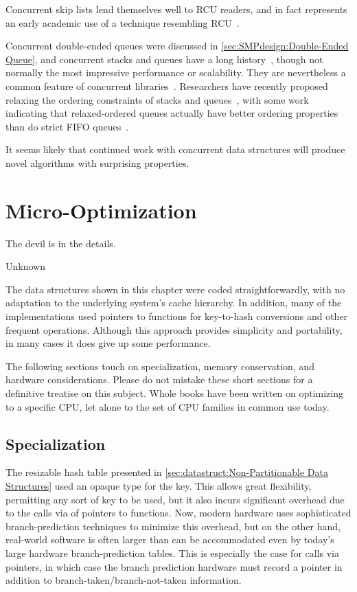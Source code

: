 Concurrent skip lists lend themselves well to RCU readers, and in fact
represents an early academic use of a technique resembling
RCU~\cite{Pugh90}.

Concurrent double-ended queues were discussed in
\cref{sec:SMPdesign:Double-Ended Queue},
and concurrent stacks and queues have a long history~\cite{Treiber86},
though not normally the most impressive performance or scalability.
They are nevertheless a common feature of concurrent
libraries~\cite{PaulMcKenney2013LWNURCUqueuestack}.
Researchers have recently proposed relaxing the ordering constraints
of stacks and queues~\cite{Shavit:2011:DSM:1897852.1897873},
with some work indicating that relaxed-ordered queues actually have
better ordering properties than do strict FIFO
queues~\cite{AndreasHaas2012FIFOisnt,ChristophMKirsch2012FIFOisntTR,AndreasHaas2013CFRelaxedQueues}.

It seems likely that continued work with concurrent data structures will
produce novel algorithms with surprising properties.

\section{Micro-Optimization}
\label{sec:datastruct:Micro-Optimization}
%
\epigraph{The devil is in the details.}{Unknown}

The data structures shown in this chapter were coded straightforwardly,
with no adaptation to the underlying system's cache hierarchy.
In addition, many of the implementations used pointers to functions
for key-to-hash conversions and other frequent operations.
Although this approach provides simplicity and portability, in many
cases it does give up some performance.

The following sections touch on specialization, memory conservation,
and hardware considerations.
Please do not mistake these short sections for a definitive treatise
on this subject.
Whole books have been written on optimizing to a specific CPU, let
alone to the set of CPU families in common use today.

\subsection{Specialization}
\label{sec:datastruct:Specialization}

The resizable hash table presented in
\cref{sec:datastruct:Non-Partitionable Data Structures}
used an opaque type for the key.
This allows great flexibility, permitting any sort of key to be
used, but it also incurs significant overhead due to the calls via
of pointers to functions.
Now, modern hardware uses sophisticated branch-prediction techniques
to minimize this overhead, but on the other hand, real-world software
is often larger than can be accommodated even by today's large
hardware branch-prediction tables.
This is especially the case for calls via pointers, in which case
the branch prediction hardware must record a pointer in addition
to branch-taken/branch-not-taken information.

